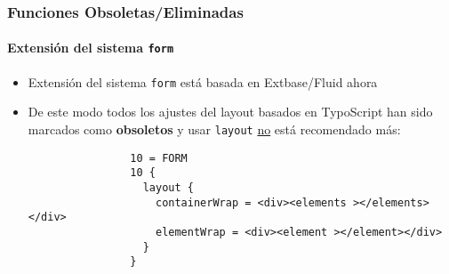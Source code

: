 \begin{frame}[fragile]
	\frametitle{Funciones Obsoletas/Eliminadas}
	\framesubtitle{Extensión del sistema \texttt{form}}

	\begin{itemize}

		\item Extensión del sistema \texttt{form} está basada en Extbase/Fluid ahora

		\item De este modo todos los ajustes del layout basados en TypoScript han sido marcados como
			\textbf{obsoletos} y usar \texttt{layout} \underline{no} está
			recomendado más:

			\begin{lstlisting}
				10 = FORM
				10 {
				  layout {
				    containerWrap = <div><elements ></elements></div>
				    elementWrap = <div><element ></element></div>
				  }
				}
			\end{lstlisting}

	\end{itemize}

\end{frame}


